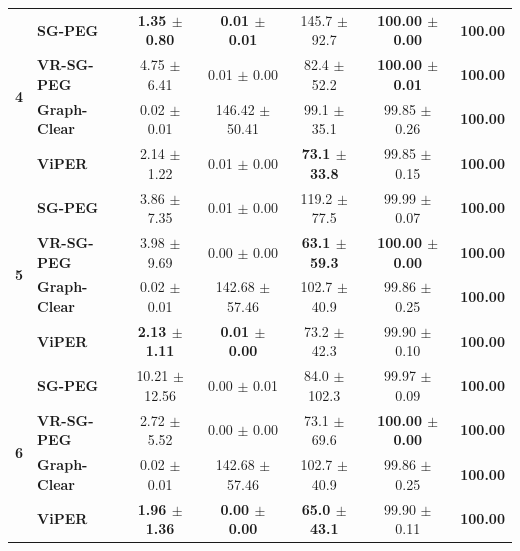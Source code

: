 \documentclass[conference]{IEEEtran}
\begin{document}
\begin{table}[t]
\begin{tabular}{l l cc c c c}
		\midrule
		
		\multirow{4}{*}{\textbf{4}}
		& \textbf{SG-PEG} 	    & \textbf{1.35 $\pm$ 0.80} &   \textbf{0.01 $\pm$ 0.01} & 145.7 $\pm$ 92.7 & \textbf{100.00 $\pm$ 0.00} & \textbf{100.00} \\
		& \textbf{VR-SG-PEG} 	& 4.75 $\pm$ 6.41 &   0.01 $\pm$ 0.00 & 82.4 $\pm$ 52.2 & \textbf{100.00 $\pm$ 0.01} & \textbf{100.00} \\
		& \textbf{Graph-Clear} 	& 0.02 $\pm$ 0.01 & 146.42 $\pm$ 50.41 & 99.1 $\pm$ 35.1 & 99.85 $\pm$ 0.26 & \textbf{100.00} \\
		& \textbf{ViPER}        & 2.14 $\pm$ 1.22 &   0.01 $\pm$ 0.00 & \textbf{73.1 $\pm$ 33.8} & 99.85 $\pm$ 0.15 & \textbf{100.00} \\

		\midrule
		
		\multirow{4}{*}{\textbf{5}}
		& \textbf{SG-PEG}        & 3.86 $\pm$ 7.35 & 0.01 $\pm$ 0.00 & 119.2 $\pm$ 77.5 & 99.99 $\pm$ 0.07 & \textbf{100.00} \\
		& \textbf{VR-SG-PEG}     & 3.98 $\pm$ 9.69 & 0.00 $\pm$ 0.00 & \textbf{63.1 $\pm$ 59.3} & \textbf{100.00 $\pm$ 0.00} & \textbf{100.00}\\
		& \textbf{Graph-Clear}   & 0.02 $\pm$ 0.01 & 142.68 $\pm$ 57.46 & 102.7 $\pm$ 40.9 & 99.86 $\pm$ 0.25 & \textbf{100.00}\\
		& \textbf{ViPER}         & \textbf{2.13 $\pm$ 1.11} & \textbf{0.01 $\pm$ 0.00} & 73.2 $\pm$ 42.3 & 99.90 $\pm$ 0.10 & \textbf{100.00} \\

		\midrule
		
		\multirow{4}{*}{\textbf{6}}
		& \textbf{SG-PEG}        & 10.21 $\pm$ 12.56 & 0.00 $\pm$ 0.01 & 84.0 $\pm$ 102.3 & 99.97 $\pm$ 0.09 & \textbf{100.00} \\
		& \textbf{VR-SG-PEG}     & 2.72 $\pm$ 5.52 & 0.00 $\pm$ 0.00 & 73.1 $\pm$ 69.6 & \textbf{100.00 $\pm$ 0.00} & \textbf{100.00} \\
		& \textbf{Graph-Clear}   & 0.02 $\pm$ 0.01 & 142.68 $\pm$ 57.46 & 102.7 $\pm$ 40.9 & 99.86 $\pm$ 0.25 & \textbf{100.00}\\
		& \textbf{ViPER} 		 & \textbf{1.96 $\pm$ 1.36} & \textbf{0.00 $\pm$ 0.00} & \textbf{65.0 $\pm$ 43.1}& 99.90 $\pm$ 0.11 &  \textbf{100.00} \\

		\bottomrule
	\end{tabular}
\end{table}
\end{document}
